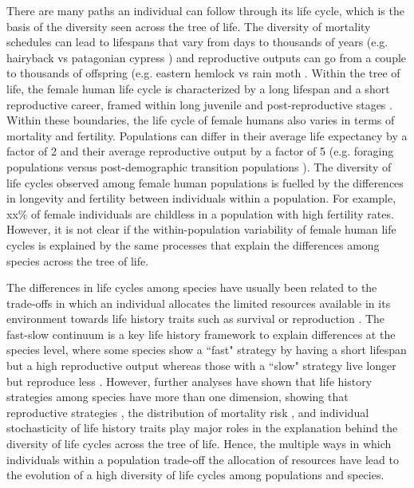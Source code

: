 \documentclass{article}
\begin{document}
There are many paths an individual can follow through its life cycle, which is the basis of the diversity seen across the tree of life. The diversity of mortality schedules can lead to lifespans that vary from days to thousands of years (e.g. hairyback vs patagonian cypress \citep{balsamo1988life,lara19933620}) and reproductive outputs can go from a couple to thousands of offspring (e.g. eastern hemlock vs rain moth \citep{tindale1932revision,van2017lifetime}. Within the tree of life, the female human life cycle is characterized by a long lifespan and a short reproductive career, framed within long juvenile and post-reproductive stages \citep{kaplan2000theory}. Within these boundaries, the life cycle of female humans also varies in terms of mortality and fertility. Populations can differ in their average life expectancy by a factor of 2 and their average reproductive output by a factor of 5 (e.g. foraging populations \citep{migliano2007life} versus post-demographic transition populations \citep{de2017maximum}). The diversity of life cycles observed among female human populations is fuelled by the differences in longevity and fertility between individuals within a population. For example, xx\% of female individuals are childless in a population with high fertility rates. However, it is not clear if the within-population variability of female human life cycles is explained by the same processes that explain the differences among species across the tree of life. 

The differences in life cycles among species have usually been related to the trade-offs in which an individual allocates the limited resources available in its environment towards life history traits such as survival or reproduction \citep{stearns2000life}. The fast-slow continuum is a key life history framework to explain differences at the species level, where some species show a ``fast" strategy by having a short lifespan but a high reproductive output whereas those with a ``slow" strategy live longer but reproduce less \citep{stearns1983influence}. However, further analyses have shown that life history strategies among species have more than one dimension, showing that reproductive strategies \citep{salguero2016fast}, the distribution of mortality risk \citep{healy2019animal}, and individual stochasticity of life history traits \citep{varas2022individual} play major roles in the explanation behind the diversity of life cycles across the tree of life. Hence, the multiple ways in which individuals within a population trade-off the allocation of resources have lead to the evolution of a high diversity of life cycles among populations and species.
\end{document}
